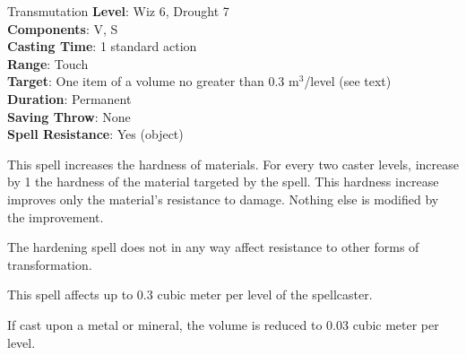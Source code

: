 {Transmutation}
{
	\textbf{Level}: Wiz 6, Drought 7\\	
	\textbf{Components}: V, S\\	
	\textbf{Casting Time}: 1 standard action\\	
	\textbf{Range}: Touch\\	
	\textbf{Target}: One item of a volume no greater than 0.3 m$^3$/level (see text)\\	
	\textbf{Duration}: Permanent\\	
	\textbf{Saving Throw}: None\\	
	\textbf{Spell Resistance}: Yes (object)\\
}
{
	This spell increases the hardness of materials. For every two caster levels, increase by 1 the hardness of the material targeted by the spell. This hardness increase improves only the material's resistance to damage. Nothing else is modified by the improvement.

	The hardening spell does not in any way affect resistance to other forms of transformation.

	This spell affects up to 0.3 cubic meter per level of the spellcaster.

	If cast upon a metal or mineral, the volume is reduced to 0.03 cubic meter per level.
}